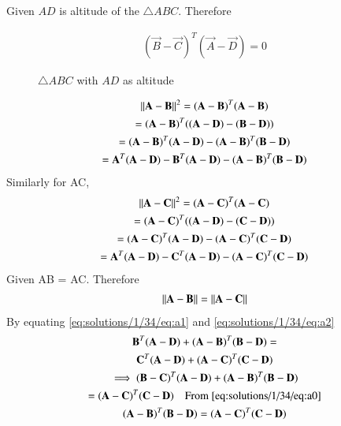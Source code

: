 
Given $AD$ is altitude of the $\triangle ABC$. Therefore

\begin{align}
(\vec{B}-\vec{C})^T(\vec{A}-\vec{D}) = 0
\label{eq:solutions/1/34/eq:a0}
\end{align}


\begin{figure}[!ht] \label{eq:solutions/1/34/fig:triangle_abc}
\centering
\resizebox{\columnwidth}{!}{}
\caption{$\triangle ABC$ with $AD$ as altitude}
\end{figure} 

\begin{multline}
\norm{\vec{A-B}}^2  = (\vec{A}-\vec{B})^T(\vec{A}-\vec{B}) \\
= (\vec{A}-\vec{B})^T((\vec{A}-\vec{D})-(\vec{B}-\vec{D})) \\
= (\vec{A}-\vec{B})^T(\vec{A}-\vec{D})-(\vec{A}-\vec{B})^T(\vec{B}-\vec{D}) \\
= \vec{A}^T(\vec{A}-\vec{D})-\vec{B}^T(\vec{A}-\vec{D})-(\vec{A}-\vec{B})^T(\vec{B}-\vec{D}) 
\label{eq:solutions/1/34/eq:a1}
\end{multline}
Similarly for AC,
\begin{multline}
\norm{\vec{A-C}}^2 = (\vec{A}-\vec{C})^T(\vec{A}-\vec{C}) \\
= (\vec{A}-\vec{C})^T((\vec{A}-\vec{D})-(\vec{C}-\vec{D})) \\
= (\vec{A}-\vec{C})^T(\vec{A}-\vec{D})-(\vec{A}-\vec{C})^T(\vec{C}-\vec{D}) \\
= \vec{A}^T(\vec{A}-\vec{D})-\vec{C}^T(\vec{A}-\vec{D})-(\vec{A}-\vec{C})^T(\vec{C}-\vec{D}) 
\label{eq:solutions/1/34/eq:a2}
\end{multline}
Given AB = AC. Therefore
\begin{align}
\norm{\vec{A-B}} = \norm{\vec{A-C}}
\label{eq:solutions/1/34/eq:a4}
\end{align}
By equating \eqref{eq:solutions/1/34/eq:a1} and \eqref{eq:solutions/1/34/eq:a2}
\begin{multline}
\vec{B}^T(\vec{A}-\vec{D})+(\vec{A}-\vec{B})^T(\vec{B}-\vec{D}) = \\ 
\vec{C}^T(\vec{A}-\vec{D})+(\vec{A}-\vec{C})^T(\vec{C}-\vec{D}) \\
\implies (\vec{B}-\vec{C})^T(\vec{A}-\vec{D})+(\vec{A}-\vec{B})^T(\vec{B}-\vec{D})  \\
= (\vec{A}-\vec{C})^T(\vec{C}-\vec{D}) \quad\text{From \eqref{eq:solutions/1/34/eq:a0}} \\
(\vec{A}-\vec{B})^T(\vec{B}-\vec{D}) = (\vec{A}-\vec{C})^T(\vec{C}-\vec{D})
\label{eq:solutions/1/34/eq:a5}
\end{multline}
